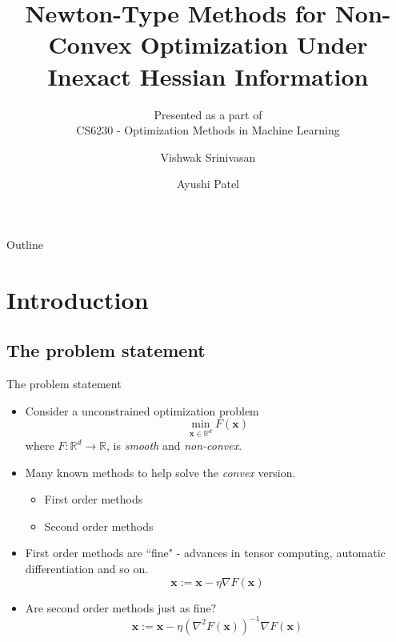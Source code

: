 \documentclass{beamer}
\title[]{Newton-Type Methods for Non-Convex Optimization Under Inexact Hessian Information}
\subtitle{Presented as a part of\\
CS6230 - Optimization Methods in Machine Learning}
\author{Vishwak Srinivasan \and Ayushi Patel}
\begin{document}
\begin{frame}
  \titlepage
\end{frame}

\begin{frame}{Outline}
  \tableofcontents
\end{frame}

\section{Introduction}
\subsection{The problem statement}

\begin{frame}{The problem statement}
  \begin{itemize}
  \item {
    Consider a unconstrained optimization problem
    \begin{equation}
        \min_{\mathbf{x} \in \mathbb{R}^{d}} F(\mathbf{x})
    \end{equation}
    where \(F : \mathbb{R}^{d} \rightarrow \mathbb{R}\), is \textit{smooth} and \textit{non-convex}.
  }

  \item<2-> {
    Many known methods to help solve the \emph{convex} version.
    \begin{itemize}
        \item First order methods
        \item Second order methods
    \end{itemize}
  }

  \item<3-> {
    First order methods are ``fine" - advances in tensor computing, automatic differentiation and so on.
    \begin{equation}
        \mathbf{x} := \mathbf{x} - \eta \nabla F(\mathbf{x})
    \end{equation}
    \pause
  }
  \item<4-> {
    Are second order methods just as fine?
    \begin{equation}
        \mathbf{x} := \mathbf{x} - \eta (\nabla^{2} F(\mathbf{x}))^{-1} \nabla F(\mathbf{x})
    \end{equation}
  }
  \end{itemize}
\end{frame}
\end{document}
